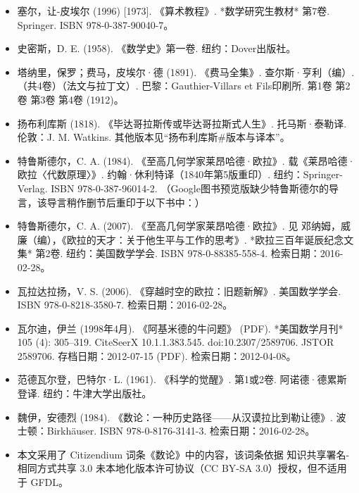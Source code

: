 \begin{itemize}
\item 塞尔，让-皮埃尔 (1996) [1973]. 《算术教程》. *数学研究生教材* 第7卷. Springer. ISBN 978-0-387-90040-7。
\item 史密斯，D. E. (1958). 《数学史》第一卷. 纽约：Dover出版社。
\item 塔纳里，保罗；费马，皮埃尔·德 (1891). 《费马全集》. 查尔斯·亨利（编）. （共4卷）（法文与拉丁文）. 巴黎：Gauthier-Villars et Fils印刷所. 第1卷 第2卷 第3卷 第4卷 (1912)。
\item 扬布利库斯 (1818). 《毕达哥拉斯传或毕达哥拉斯式人生》. 托马斯·泰勒译. 伦敦：J. M. Watkins. 其他版本见“扬布利库斯#版本与译本”。
\item 特鲁斯德尔，C. A. (1984). 《至高几何学家莱昂哈德·欧拉》. 载《莱昂哈德·欧拉〈代数原理〉》. 约翰·休利特译（1840年第5版重印）. 纽约：Springer-Verlag. ISBN 978-0-387-96014-2. （Google图书预览版缺少特鲁斯德尔的导言，该导言稍作删节后重印于以下书中：）
\item 特鲁斯德尔，C. A. (2007). 《至高几何学家莱昂哈德·欧拉》. 见 邓纳姆，威廉（编），《欧拉的天才：关于他生平与工作的思考》. *欧拉三百年诞辰纪念文集* 第2卷. 纽约：美国数学学会. ISBN 978-0-88385-558-4. 检索日期：2016-02-28。
\item 瓦拉达拉扬，V. S. (2006). 《穿越时空的欧拉：旧题新解》. 美国数学学会. ISBN 978-0-8218-3580-7. 检索日期：2016-02-28。
\item 瓦尔迪，伊兰 (1998年4月). 《阿基米德的牛问题》 (PDF). *美国数学月刊* 105 (4): 305–319. CiteSeerX 10.1.1.383.545. doi:10.2307/2589706. JSTOR 2589706. 存档日期：2012-07-15 (PDF). 检索日期：2012-04-08。
\item 范德瓦尔登，巴特尔·L. (1961). 《科学的觉醒》. 第1或2卷. 阿诺德·德累斯登译. 纽约：牛津大学出版社。
\item 魏伊，安德烈 (1984). 《数论：一种历史路径——从汉谟拉比到勒让德》. 波士顿：Birkhäuser. ISBN 978-0-8176-3141-3. 检索日期：2016-02-28。
\item 本文采用了 Citizendium 词条《数论》中的内容，该词条依据 知识共享署名-相同方式共享 3.0 未本地化版本许可协议（CC BY-SA 3.0）授权，但不适用于 GFDL。
\end{itemize}
